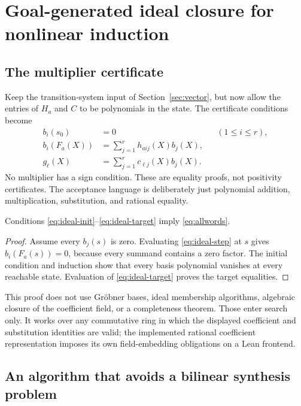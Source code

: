 \section{Goal-generated ideal closure for nonlinear induction}
\label{sec:ideal}

\subsection{The multiplier certificate}

Keep the transition-system input of Section~\ref{sec:vector}, but now allow the entries of $H_a$ and $C$ to be polynomials in the state. The certificate conditions become
\begin{align}
 b_i(s_0)&=0 &&(1\le i\le r),\label{eq:ideal-init}\\
 b_i(F_a(X))&=\sum_{j=1}^r h_{aij}(X)b_j(X),\label{eq:ideal-step}\\
 g_\ell(X)&=\sum_{j=1}^r c_{\ell j}(X)b_j(X).
 \label{eq:ideal-target}
\end{align}
No multiplier has a sign condition. These are equality proofs, not positivity certificates. The acceptance language is deliberately just polynomial addition, multiplication, substitution, and rational equality.

\begin{theorem}
Conditions \eqref{eq:ideal-init}--\eqref{eq:ideal-target} imply \eqref{eq:allwords}.
\end{theorem}
\begin{proof}
Assume every $b_j(s)$ is zero. Evaluating \eqref{eq:ideal-step} at $s$ gives $b_i(F_a(s))=0$, because every summand contains a zero factor. The initial condition and induction show that every basis polynomial vanishes at every reachable state. Evaluation of \eqref{eq:ideal-target} proves the target equalities.
\end{proof}

This proof does not use Gr\"obner bases, ideal membership algorithms, algebraic closure of the coefficient field, or a completeness theorem. Those enter search only. It works over any commutative ring in which the displayed coefficient and substitution identities are valid; the implemented rational coefficient representation imposes its own field-embedding obligations on a Lean frontend.

\subsection{An algorithm that avoids a bilinear synthesis problem}

